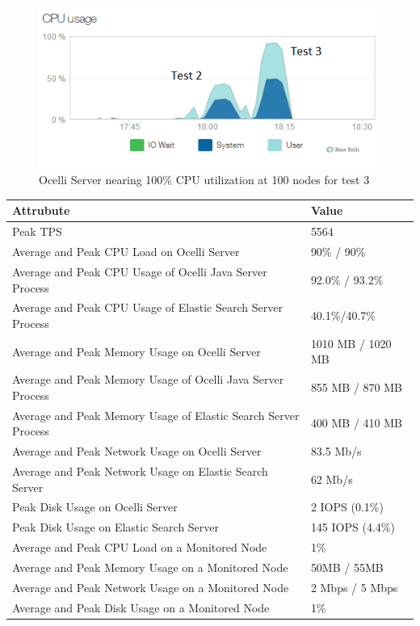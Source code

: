 \documentclass{llncs}
\begin{document}
\begin{figure}[h]
    \centering
    \includegraphics[scale=0.7]{app13}
    \caption{Ocelli Server nearing 100\% CPU utilization at 100 nodes for test 3}
    \label{fig:ocelli_dm}
\end{figure}

\begin{flushleft}
    \begin{tabular}{ | l | l |}
    \hline
  Attrubute & Value  \\ \hline
  Peak TPS & 5564  \\ \hline
  Average and Peak CPU Load on Ocelli Server &90\% / 90\%  \\ \hline
  Average and Peak CPU Usage of Ocelli Java Server Process & 92.0\% / 93.2\% \\ \hline
 Average and Peak CPU Usage of Elastic Search Server Process & 40.1\%/40.7\%	  \\ \hline
  Average and Peak Memory Usage on Ocelli Server & 1010 MB / 1020 MB	 \\ \hline
  Average and Peak Memory Usage of Ocelli Java Server Process &	855 MB / 870 MB		 \\ \hline
 Average and Peak Memory Usage of Elastic Search Server Process &	400 MB / 410 MB		 \\ \hline
Average and Peak Network Usage on Ocelli Server &	83.5 Mb/s 	 \\ \hline
Average and Peak Network Usage on Elastic Search Server & 62 Mb/s 	 \\ \hline
Peak Disk Usage on Ocelli Server &	2 IOPS (0.1\%)		 \\ \hline
Peak Disk Usage on Elastic Search Server &	145 IOPS (4.4\%)		 \\ \hline
Average and Peak CPU Load on a Monitored Node& 	1\% 	 \\ \hline
  Average and Peak Memory Usage on a Monitored Node &	50MB / 55MB	 \\ \hline
Average and Peak Network Usage on a Monitored Node &	2 Mbps / 5 Mbps		 \\ \hline
  Average and Peak Disk Usage on a Monitored Node &  1\%	\\ 
    \hline
    \end{tabular}
\end{flushleft}
\end{document}
